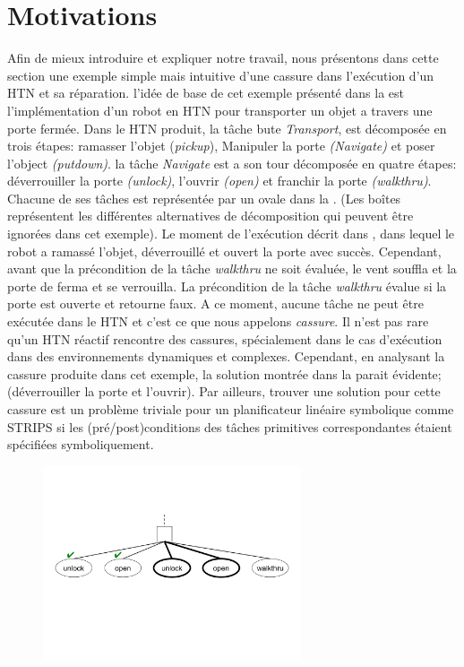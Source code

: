 \documentclass[a4paper,twoside,french]{article}
\begin{document}
		\section{Motivations}
		Afin de mieux introduire et expliquer notre travail, nous présentons dans cette section une exemple simple mais intuitive d'une cassure dans l'exécution d'un HTN et sa réparation. l'idée de base de cet exemple présenté dans la   est l'implémentation d'un robot en HTN pour transporter un objet a travers une porte fermée. Dans le HTN produit, la tâche bute {\em Transport}, est décomposée en trois étapes: ramasser l'objet ({\em pickup}), Manipuler la porte {\em(Navigate)} et poser l'object {\em(putdown)}. la tâche {\em Navigate} est a son tour décomposée en quatre étapes: déverrouiller  la porte {\em(unlock)}, l'ouvrir {\em(open)} et franchir la porte {\em(walkthru)}. Chacune de ses tâches est représentée par un ovale dans la . (Les boîtes représentent les différentes alternatives de décomposition qui peuvent être ignorées dans cet exemple). Le moment de l'exécution décrit dans , dans lequel le robot a ramassé l'objet, déverrouillé et ouvert la porte avec succès. Cependant, avant que la précondition de la tâche {\em walkthru} ne soit évaluée, le vent souffla et la porte de ferma et se verrouilla. La précondition de la tâche {\em walkthru} évalue si la porte est ouverte et retourne faux. A ce moment, aucune tâche ne peut être exécutée dans le HTN et c'est ce que nous appelons {\em cassure}. Il n'est pas rare qu'un HTN réactif rencontre des cassures, spécialement dans le cas d'exécution dans des environnements dynamiques et complexes. Cependant, en analysant la cassure produite dans cet exemple, la solution montrée dans la  parait évidente; (déverrouiller la porte et l'ouvrir). Par ailleurs, trouver une solution pour cette cassure est un problème triviale pour un planificateur linéaire symbolique comme STRIPS si les (pré/post)conditions des tâches primitives correspondantes étaient spécifiées  symboliquement.
		
			\begin{figure}[t]
				\centerline{\includegraphics[width=3in]{figs/recover}}
				\vskip 8pt
			\end{figure}
	
\end{document}
